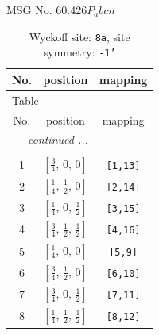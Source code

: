\documentclass[fleqn,8pt]{jsarticle}
\begin{document}
\setcounter{MaxMatrixCols}{32}

\renewcommand{\tablename}{Table~}
\renewcommand{\figurename}{Figure~}
\begin{center}
\LARGE
MSG No. 60.426\quad$P_{a}bcn$
\end{center}
\renewcommand{\arraystretch}{1.2}
\begin{longtable}{ccc}
\caption{Wyckoff site: {\tt 8a}, site symmetry: {\tt -1'}}
 \\
 \hline \hline
No. & position & mapping \\ \hline \endfirsthead

\multicolumn{2}{l}{\tablename\ \thetable{}} \\
 \hline \hline
No. & position & mapping \\ \hline \endhead

 \hline \hline
\multicolumn{2}{r}{\footnotesize\it continued ...} \\ \endfoot

 \hline \hline
\multicolumn{2}{r}{} \\ \endlastfoot

1 & $\left[ \frac{3}{4},\, 0,\, 0 \right]$ & {\tt [1,13]} \\ \hline
2 & $\left[ \frac{1}{4},\, \frac{1}{2},\, 0 \right]$ & {\tt [2,14]} \\ \hline
3 & $\left[ \frac{1}{4},\, 0,\, \frac{1}{2} \right]$ & {\tt [3,15]} \\ \hline
4 & $\left[ \frac{3}{4},\, \frac{1}{2},\, \frac{1}{2} \right]$ & {\tt [4,16]} \\ \hline
5 & $\left[ \frac{1}{4},\, 0,\, 0 \right]$ & {\tt [5,9]} \\ \hline
6 & $\left[ \frac{3}{4},\, \frac{1}{2},\, 0 \right]$ & {\tt [6,10]} \\ \hline
7 & $\left[ \frac{3}{4},\, 0,\, \frac{1}{2} \right]$ & {\tt [7,11]} \\ \hline
8 & $\left[ \frac{1}{4},\, \frac{1}{2},\, \frac{1}{2} \right]$ & {\tt [8,12]} \\
\end{longtable}
\renewcommand{\arraystretch}{1.2}
\end{document}
